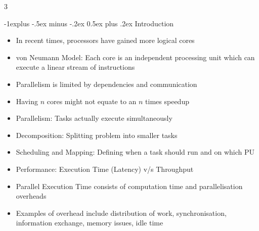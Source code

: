 \documentclass[10pt, landscape]{article}
\makeatletter
\renewcommand{\section}{\@startsection{section}{1}{0mm}%
                                {-1ex plus -.5ex minus -.2ex}%
                                {0.5ex plus .2ex}%
                                {\normalfont\large\bfseries}}
\renewcommand{\section}{\@startsection{section}{2}{0mm}%
                                {-1explus -.5ex minus -.2ex}%
                                {0.5ex plus .2ex}%
                                {\normalfont\normalsize\bfseries}}
\makeatother
\begin{document}
\raggedright
\footnotesize
\begin{multicols*}{3}

\setlength{\columnseprule}{0.25pt}
\setlength{\premulticols}{1pt}
\setlength{\postmulticols}{1pt}
\setlength{\multicolsep}{1pt}
\setlength{\columnsep}{2pt}

\begin{center}
\end{center}

\section{Introduction}
\begin{itemize}
    \item In recent times, processors have gained more logical cores
    \item von Neumann Model: Each core is an independent processing unit which can execute a linear stream of instructions
    \item Parallelism is limited by dependencies and communication
    \item Having $n$ cores might not equate to an $n$ times speedup
    \item Parallelism: Tasks actually execute simultaneously
    \item Decomposition: Splitting problem into smaller tasks
    \item Scheduling and Mapping: Defining when a task should run and on which PU
    \item Performance: Execution Time (Latency) v/s Throughput
    \item Parallel Execution Time consists of computation time and parallelisation overheads
    \item Examples of overhead include distribution of work, synchronisation, information exchange, memory issues, idle time
\end{itemize}


\end{multicols*}
\end{document}
